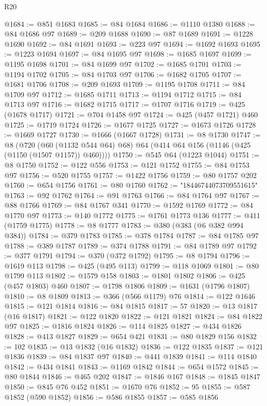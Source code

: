 \begin{lexlean}{R20}
\begin{coremodule}
@1684 := @851 @1683
@1685 := @84 @1684
@1686 := @1110 @1380
@1688 := @84 @1686 @97
@1689 := @209 @1688
@1690 := @87 @1689
@1691 := @1228 @1690
@1692 := @84 @1691
@1693 := @223 @97
@1694 := @1692 @1693
@1695 := @1223 @1694
@1697 := @84 @1695 @97
@1698 := @1685 @1697
@1699 := @1195 @1698
@1701 := @84 @1699 @97
@1702 := @1685 @1701
@1703 := @1194 @1702
@1705 := @84 @1703 @97
@1706 := @1682 @1705
@1707 := @1681 @1706
@1708 := @209 @1693
@1709 := @1195 @1708
@1711 := @84 @1709 @97
@1712 := @1685 @1711
@1713 := @1194 @1712
@1715 := @84 @1713 @97
@1716 := @1682 @1715
@1717 := @1707 @1716
@1719 := @425 (@1678 @1717)
@1721 := @704 @1458 @97
@1724 := @425 (@457 @1721) @460
@1725 := @1719 @1724
@1726 := @1677 @1725
@1727 := @1673 @1726
@1728 := @1669 @1727
@1730 := @1666 (@1667 @1728)
@1731 := @8 @1730
@1747 := @8
    (@720 (@60 (@1132 @544 @64) @68) @64 (@414 @64 @156 (@1146 (@425 (@1150 (@1507 @1157)) @460))))
@1750 := @545 @64 (@1223 @1044)
@1751 := @8 @1750
@1752 := @122 @556
@1753 := @121 @1752
@1755 := @84 @1753 @97
@1756 := @520 @1755
@1757 := @1422 @1756
@1759 := @80 @1757 @202
@1760 := @654 @1756
@1761 := @80 @1760
@1762 := "18446744073709551615"
@1763 := @92 @1762
@1764 := @91 @1763
@1766 := @84 @1764 @97
@1767 := @88 @1766
@1769 := @84 @1767 @341
@1770 := @1592 @1769
@1772 := @84 @1770 @97
@1773 := @140 @1772
@1775 := @1761 @1773 @136
@1777 := @411 (@1759 @1775)
@1778 := @8 @1777
@1783 := @380 (@383 (@6 @382 @994 @384))
@1784 := @379 @1783
@1785 := @378 @1784
@1787 := @84 @1785 @97
@1788 := @389 @1787
@1789 := @374 @1788
@1791 := @84 @1789 @97
@1792 := @377 @1791
@1794 := @370 (@372 @1792)
@1795 := @8 @1794
@1796 := @1619 @113
@1798 := @425 (@495 @113)
@1799 := @118 @1069
@1801 := @80 @1799 @113
@1802 := @1579 @158
@1803 := @1801 @1802
@1806 := @425 (@457 @1803) @460
@1807 := @1798 @1806
@1809 := @1631 (@1796 @1807)
@1810 := @8 @1809
@1813 := @366 (@566 @1179) @76
@1814 := @122 @1646
@1815 := @121 @1814
@1816 := @84 @1815
@1817 := 57
@1820 := @13 @1817 (@16 @1817)
@1821 := @122 @1820
@1822 := @121 @1821
@1824 := @84 @1822 @97
@1825 := @1816 @1824
@1826 := @114 @1825
@1827 := @434 @1826
@1828 := @413 @1827
@1829 := @654 @421
@1831 := @80 @1829 @156
@1832 := 102
@1835 := @13 @1832 (@16 @1832)
@1836 := @122 @1835
@1837 := @121 @1836
@1839 := @84 @1837 @97
@1840 := @441 @1839
@1841 := @114 @1840
@1842 := @434 @1841
@1843 := @1169 @1842
@1844 := @654 @1572
@1845 := @80 @1844
@1846 := @465 @202
@1847 := @1846 @167
@1848 := @1845 @1847
@1850 := @845 @76 @452
@1851 := @1670 @76
@1852 := 95
@1855 := @587 @1852 (@590 @1852)
@1856 := @586 @1855
@1857 := @585 @1856

\end{coremodule}
\end{lexlean}
